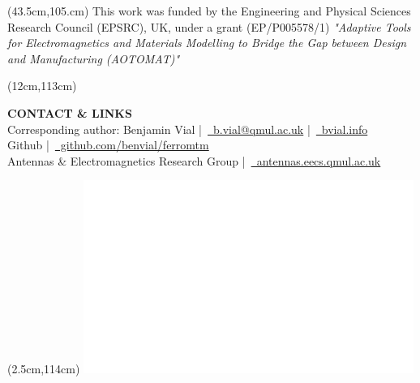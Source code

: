 \documentclass[final,12pt]{beamer} %
\begin{document}
\begin{frame}
\begin{textblock*}{38.5cm}(43.5cm,105.cm)
\color{fresnelblack}
This work was funded by the Engineering and Physical Sciences Research
Council (EPSRC), UK, under a grant (EP/P005578/1) \textit{"Adaptive Tools for
Electromagnetics and Materials Modelling to Bridge the Gap between
Design and Manufacturing (AOTOMAT)"}
\end{textblock*}
%

\begin{textblock*}{70cm}(12cm,113cm)

{\hfill\semiboldfont \bfseries \color{fresnelorange} \Large CONTACT \& LINKS}\\
\vspace*{0.5em}
\color{white}
\hfill Corresponding author: Benjamin Vial |~\textcolor{fresnelorange}{\href{mailto:b.vial@qmul.ac.uk}{\faEnvelope~b.vial@qmul.ac.uk}}
|~\textcolor{fresnelorange}{\href{http://bvial.info}{\faExternalLink~bvial.info}}\\
\hfill Github |~\textcolor{fresnelorange}{\href{https://github.com/benvial/ferromtm}{\faGithub~github.com/benvial/ferromtm}}\\
\hfill Antennas \& Electromagnetics Research Group |~\textcolor{fresnelorange}{\href{http://antennas.eecs.qmul.ac.uk}{\faExternalLink~antennas.eecs.qmul.ac.uk}}

\end{textblock*}


\begin{textblock*}{5.5cm}(2.5cm,114cm)
 \includegraphics[width=\columnwidth]{./logos/logo_epsrc.png}
\end{textblock*}


\end{frame}
\end{document}
